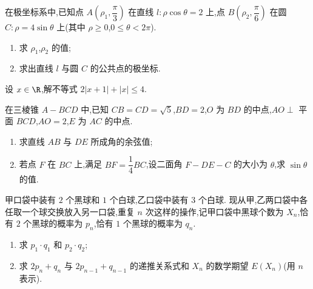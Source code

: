 \reuseproblemnumber
\begin{problem}[B]
在极坐标系中,已知点 \(A\!\left(\rho_1,\dfrac\pi3\right)\) 在直线 \(l:\rho\cos\theta=2\) 上,点 \(B\!\left(\rho_2,\dfrac\pi6\right)\) 在圆 \(C:\rho=4\sin\theta\) 上(其中 \(\rho\ge0\),\(0\le\theta<2\pi\)).

\begin{enumerate}
\item 求 \(\rho_1\),\(\rho_2\) 的值;
\item 求出直线 \(l\) 与圆 \(C\) 的公共点的极坐标.
\end{enumerate}
\end{problem}

\reuseproblemnumber
\begin{problem}[C]
设 \(x\in\R\),解不等式 \(2\lvert x+1\rvert+\lvert x\rvert\le4\).
\end{problem}

\begin{problem}
在三棱锥 \(A-BCD\) 中,已知 \(CB=CD=\sqrt5\),\(BD=2\),\(O\) 为 \(BD\) 的中点,\(AO\perp\) 平面 \(BCD\),\(AO=2\),\(E\) 为 \(AC\) 的中点.

\begin{enumerate}
\item 求直线 \(AB\) 与 \(DE\) 所成角的余弦值;
\item 若点 \(F\) 在 \(BC\) 上,满足 \(BF=\dfrac14BC\),设二面角 \(F-DE-C\) 的大小为 \(\theta\),求 \(\sin\theta\) 的值.
\end{enumerate}

\end{problem}

\begin{problem}
甲口袋中装有 \(2\) 个黑球和 \(1\) 个白球,乙口袋中装有 \(3\) 个白球. 现从甲,乙两口袋中各任取一个球交换放入另一口袋,重复 \(n\) 次这样的操作,记甲口袋中黑球个数为 \(X_n\),恰有 \(2\) 个黑球的概率为 \(p_n\),恰有 \(1\) 个黑球的概率为 \(q_n\).

\begin{enumerate}
\item 求 \(p_1\cdot q_1\) 和 \(p_2\cdot q_2\);
\item 求 \(2p_n+q_n\) 与 \(2p_{n-1}+q_{n-1}\) 的递推关系式和 \(X_n\) 的数学期望 \(E(X_n)\)(用 \(n\) 表示).
\end{enumerate}
\end{problem}


